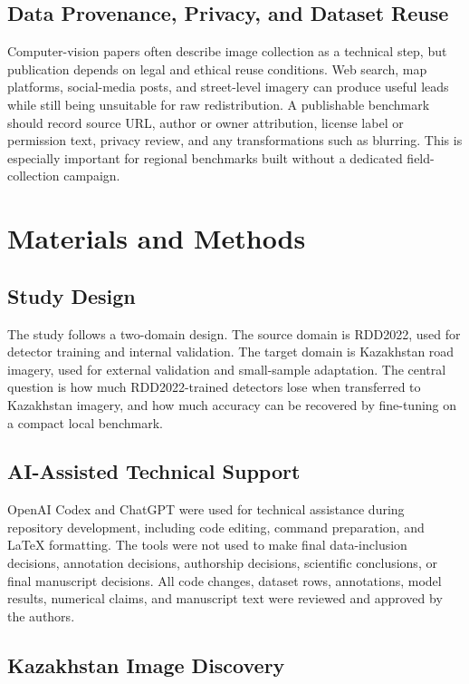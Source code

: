 \documentclass[applsci,article,submit,moreauthors]{Definitions/mdpi}
\begin{document}
\subsection{Data Provenance, Privacy, and Dataset Reuse}

Computer-vision papers often describe image collection as a technical step, but publication depends on legal and ethical reuse conditions. Web search, map platforms, social-media posts, and street-level imagery can produce useful leads while still being unsuitable for raw redistribution. A publishable benchmark should record source URL, author or owner attribution, license label or permission text, privacy review, and any transformations such as blurring. This is especially important for regional benchmarks built without a dedicated field-collection campaign.

\section{Materials and Methods}

\subsection{Study Design}

The study follows a two-domain design. The source domain is RDD2022, used for detector training and internal validation. The target domain is Kazakhstan road imagery, used for external validation and small-sample adaptation. The central question is how much RDD2022-trained detectors lose when transferred to Kazakhstan imagery, and how much accuracy can be recovered by fine-tuning on a compact local benchmark.

\subsection{AI-Assisted Technical Support}

OpenAI Codex and ChatGPT were used for technical assistance during repository development, including code editing, command preparation, and LaTeX formatting. The tools were not used to make final data-inclusion decisions, annotation decisions, authorship decisions, scientific conclusions, or final manuscript decisions. All code changes, dataset rows, annotations, model results, numerical claims, and manuscript text were reviewed and approved by the authors.

\subsection{Kazakhstan Image Discovery}
\end{document}

